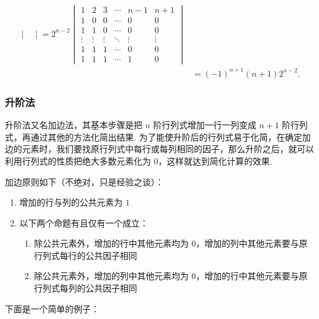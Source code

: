 \begin{solution}
\begin{align*}
\begin{vmatrix}
               \end{vmatrix}=2^{n-2}
        \begin{vmatrix}
            1      & 2      & 3      & \cdots & n-1    & n+1    \\
            1      & 0      & 0      & \cdots & 0      & 0      \\
            1      & 1      & 0      & \cdots & 0      & 0      \\
            \vdots & \vdots & \vdots & \ddots & \vdots & \vdots \\
            1      & 1      & 1      & \cdots & 0      & 0      \\
            1      & 1      & 1      & \cdots & 1      & 0
        \end{vmatrix}                      \\
            & =(-1)^{n+1}(n+1) 2^{n-2}.
    \end{align*}
\end{solution}


\subsubsection{升阶法}

升阶法又名加边法，其基本步骤是把 $n$ 阶行列式增加一行一列变成 $n+1$ 阶行列式，再通过其他的方法化简出结果. 为了能使升阶后的行列式易于化简，在确定加边的元素时，我们要找原行列式中每行或每列相同的因子，那么升阶之后，就可以利用行列式的性质把绝大多数元素化为 $0$，这样就达到简化计算的效果.

加边原则如下（不绝对，只是经验之谈）：

\begin{enumerate}
    \item 增加的行与列的公共元素为 $1$
    \item 以下两个命题有且仅有一个成立：
        \begin{enumerate}
            \item 除公共元素外，增加的行中其他元素均为 $0$，增加的列中其他元素要与原行列式每行的公共因子相同
            \item 除公共元素外，增加的列中其他元素均为 $0$，增加的行中其他元素要与原行列式每列的公共因子相同
        \end{enumerate}
\end{enumerate}

下面是一个简单的例子：

